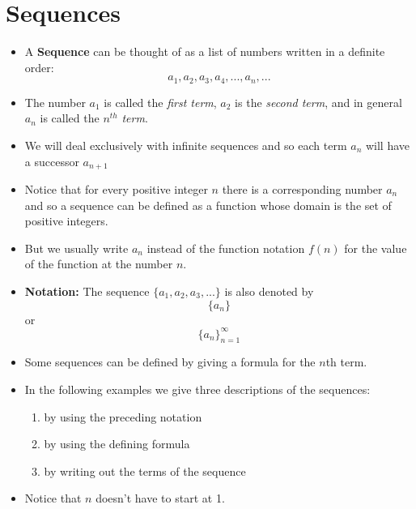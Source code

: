 \documentclass[]{book}
\providecommand{\tightlist}{%
  \setlength{\itemsep}{0pt}\setlength{\parskip}{0pt}}
\begin{document}
\hypertarget{sequences}{%
\section{Sequences}\label{sequences}}

\begin{itemize}
\tightlist
\item
  A \textbf{Sequence} can be thought of as a list of numbers written in a definite order:
  \[a_{1}, a_{2}, a_{3}, a_{4}, ..., a_{n}, ...\]
\item
  The number \(a_{1}\) is called the \emph{first term}, \(a_{2}\) is the \emph{second term}, and in general \(a_{n}\) is called the \(n^{th}\) \emph{term}.
\item
  We will deal exclusively with infinite sequences and so each term \(a_{n}\) will have a successor \(a_{n+1}\)
\item
  Notice that for every positive integer \(n\) there is a corresponding number \(a_{n}\) and so a sequence can be defined as a function whose domain is the set of positive integers.
\item
  But we usually write \(a_{n}\) instead of the function notation \(f(n)\) for the value of the function at the number \(n\).
\item
  \textbf{Notation:} The sequence \(\{a_{1}, a_{2}, a_{3},...\}\) is also denoted by
  \[\{a_{n}\}\] or \[\{a_{n}\}_{n=1}^{\infty}\]
\item
  Some sequences can be defined by giving a formula for the \(n\)th term.
\item
  In the following examples we give three descriptions of the sequences:

  \begin{enumerate}
  \def\labelenumi{\roman{enumi}.}
  \tightlist
  \item
    by using the preceding notation
  \item
    by using the defining formula
  \item
    by writing out the terms of the sequence
  \end{enumerate}
\item
  Notice that \(n\) doesn't have to start at 1.
\end{itemize}
\end{document}
